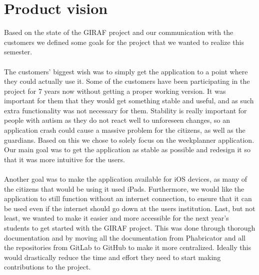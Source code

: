 \section{Product vision}
Based on the state of the GIRAF project and our communication with the customers we defined some goals for the project that we wanted to realize this semester.
\\\\
The customers' biggest wish was to simply get the application to a point where they could actually use it.
Some of the customers have been participating in the project for 7 years now without getting a proper working version.
It was important for them that they would get something stable and useful, and as such extra functionality was not necessary for them.
Stability is really important for people with autism as they do not react well to unforeseen changes, so an application crash could cause a massive problem for the citizens, as well as the guardians.
Based on this we chose to solely focus on the weekplanner application.
Our main goal was to get the application as stable as possible and redesign it so that it was more intuitive for the users.
\\\\
Another goal was to make the application available for iOS devices, as many of the citizens that would be using it used iPads.
Furthermore, we would like the application to still function without an internet connection, to ensure that it can be used even if the internet should go down at the users institution.
Last, but not least, we wanted to make it easier and more accessible for the next year's students to get started with the GIRAF project.
This was done through thorough documentation and by moving all the documentation from Phabricator and all the repositories from GitLab to GitHub to make it more centralized.
Ideally this would drastically reduce the time and effort they need to start making contributions to the project.
